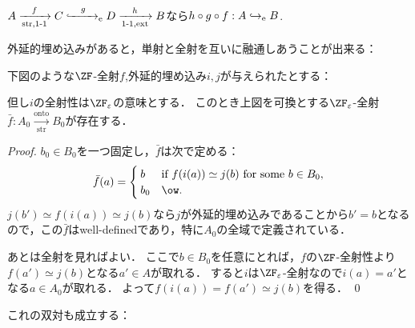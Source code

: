 \documentclass[realisability.tex]{subfiles}
\begin{document}
\begin{lemma}\label{lem:compos-ext-emb}
 $A \xrightarrow[\mathrm{str}, \text{1-1}]{f} C \mathrel{\smash{\xhookrightarrow[\hphantom{\mathrm{str}, \text{1-1}}]{g}}_{\mathrm{e}}} D \xrightarrow[\text{1-1}, \mathrm{ext}]{h} B$なら$h \circ g \circ f: A \hookrightarrow_{\mathrm{e}} B$.
\end{lemma}
外延的埋め込みがあると，単射と全射を互いに融通しあうことが出来る：
\begin{lemma}
 下図のような$\ZF$-全射$f$,外延的埋め込み$i, j$が与えられたとする：
 \begin{center}
 \end{center}
 但し$i$の全射性は$\ZFe$の意味とする．
 このとき上図を可換とする$\ZFe$-全射$\bar{f}: A_0 \xrightarrow[\mathrm{str}]{\mathrm{onto}} B_0$が存在する．
\end{lemma}
\begin{proof}
 $b_0 \in B_0$を一つ固定し，$\bar{f}$は次で定める：
 \[
  \bar{f}(a) =
  \begin{cases}
   b   & \text{if } f(i(a)) \simeq j(b) \text{ for some } b \in B_0,\\
   b_0 & \ow.
  \end{cases}
 \]
 $j(b') \simeq f(i(a)) \simeq j(b)$なら$j$が外延的埋め込みであることから$b' = b$となるので，この$\bar{f}$はwell-definedであり，特に$A_0$の全域で定義されている．

 あとは全射を見ればよい．
 ここで$b \in B_0$を任意にとれば，$f$の$\ZF$-全射性より$f(a') \simeq j(b)$となる$a' \in A$が取れる．
 すると$i$は$\ZFe$-全射なので$i(a) = a'$となる$a \in A_0$が取れる．
 よって$f(i(a)) = f(a') \simeq j(b)$を得る． \qed
\end{proof}
これの双対も成立する：
\end{document}
